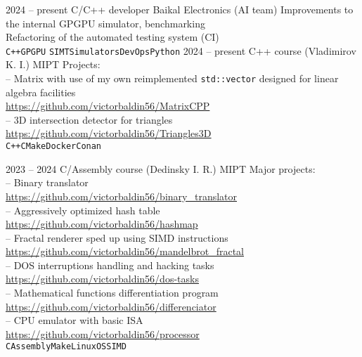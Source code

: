 \documentclass[9pt]{developercv} %
\begin{document}
\begin{entrylist}
        \entry
                {2024 -- present}
                {C/C++ developer}
                {Baikal Electronics (AI team)}
                {Improvements to the internal GPGPU simulator, benchmarking\\
                 Refactoring of the automated testing system (CI)\\
                  \texttt{C++}\slashsep\texttt{GPGPU}
                  \slashsep\texttt{SIMT}\slashsep\texttt{Simulators}\slashsep\texttt{DevOps}\slashsep\texttt{Python}}
        \entry
                {2024 -- present}
                {C++ course (Vladimirov K. I.)}
                {MIPT}
                {Projects:\\
                 -- Matrix with use of my own reimplemented \texttt{std::vector} designed for linear algebra facilities\\
                 \url{https://github.com/victorbaldin56/MatrixCPP}\\
                 -- 3D intersection detector for triangles\\
                 \url{https://github.com/victorbaldin56/Triangles3D}\\
                 \texttt{C++}\slashsep\texttt{CMake}\slashsep\texttt{Docker}\slashsep\texttt{Conan}}

        \entry
                {2023 -- 2024}
                {C/Assembly course (Dedinsky I. R.)}
                {MIPT}
                {Major projects:\\
                 -- Binary translator\\
                 \url{https://github.com/victorbaldin56/binary_translator}\\
                 -- Aggressively optimized hash table\\
                 \url{https://github.com/victorbaldin56/hashmap}\\
                 -- Fractal renderer sped up using SIMD instructions\\
                 \url{https://github.com/victorbaldin56/mandelbrot_fractal}\\
                 -- DOS interruptions handling and hacking tasks\\
                 \url{https://github.com/victorbaldin56/dos-tasks}\\
                 -- Mathematical functions differentiation program\\
                 \url{https://github.com/victorbaldin56/differenciator}\\
                 -- CPU emulator with basic ISA\\
                 \url{https://github.com/victorbaldin56/processor}\\
                 \texttt{C}\slashsep\texttt{Assembly}\slashsep\texttt{Make}\slashsep\texttt{Linux}\slashsep\texttt{OS}\slashsep\texttt{SIMD}}


\end{entrylist}
\end{document}
